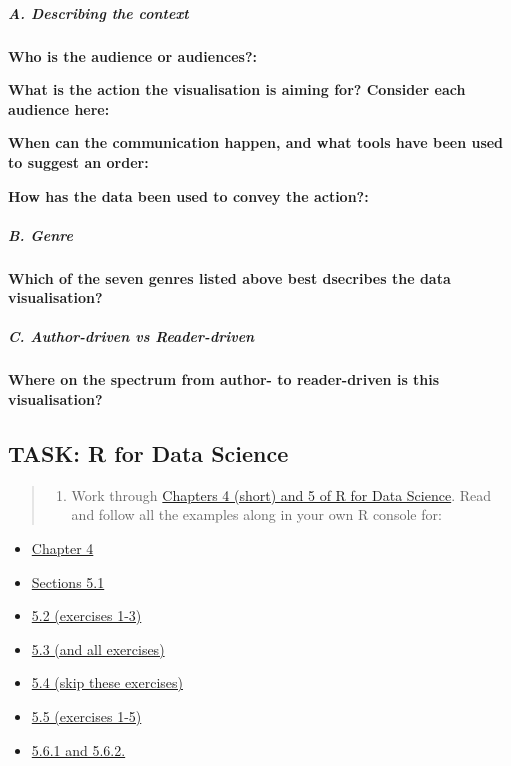 \documentclass[]{article}
\providecommand{\tightlist}{%
  \setlength{\itemsep}{0pt}\setlength{\parskip}{0pt}}
\let\oldsubparagraph\subparagraph
\renewcommand{\subparagraph}[1]{\oldsubparagraph{#1}\mbox{}}
\begin{document}
\subparagraph{A. Describing the
context}\label{a.-describing-the-context-2}

\textbf{Who is the audience or audiences?: }

\textbf{What is the action the visualisation is aiming for? Consider
each audience here:}

\textbf{When can the communication happen, and what tools have been used
to suggest an order:}

\textbf{How has the data been used to convey the action?:}

\subparagraph{B. Genre}\label{b.-genre-2}

\textbf{Which of the seven genres listed above best dsecribes the data
visualisation?}

\subparagraph{C. Author-driven vs
Reader-driven}\label{c.-author-driven-vs-reader-driven-2}

\textbf{Where on the spectrum from author- to reader-driven is this
visualisation?}

\subsection{TASK: R for Data Science}\label{task-r-for-data-science}

\begin{quote}
\begin{enumerate}
\def\labelenumi{\arabic{enumi}.}
\setcounter{enumi}{1}
\tightlist
\item
  Work through
  \href{https://r4ds.had.co.nz/data-visualisation.html}{Chapters 4
  (short) and 5 of R for Data Science}. Read and follow all the examples
  along in your own R console for:
\end{enumerate}
\end{quote}

\begin{itemize}
\tightlist
\item
  \href{https://r4ds.had.co.nz/workflow-basics.html}{Chapter 4}\\
\item
  \href{https://r4ds.had.co.nz/transform.html\#introduction-2}{Sections
  5.1}
\item
  \href{https://r4ds.had.co.nz/transform.html\#filter-rows-with-filter}{5.2
  (exercises 1-3)}
\item
  \href{https://r4ds.had.co.nz/transform.html\#arrange-rows-with-arrange}{5.3
  (and all exercises)}
\item
  \href{https://r4ds.had.co.nz/transform.html\#select}{5.4 (skip these
  exercises)}
\item
  \href{https://r4ds.had.co.nz/transform.html\#add-new-variables-with-mutate}{5.5
  (exercises 1-5)}
\item
  \href{https://r4ds.had.co.nz/transform.html\#grouped-summaries-with-summarise}{5.6.1
  and 5.6.2.}
\end{itemize}
\end{document}
